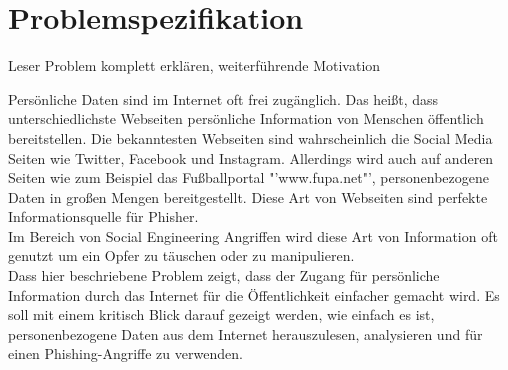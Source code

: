 

\chapter{Problemspezifikation}  %
\label{cha:Problemspezifikation} %
Leser Problem komplett erklären, weiterführende Motivation


Persönliche Daten sind im Internet oft frei zugänglich. Das heißt, dass unterschiedlichste Webseiten persönliche Information von Menschen öffentlich bereitstellen. Die bekanntesten Webseiten sind wahrscheinlich die Social Media Seiten wie Twitter, Facebook und Instagram. Allerdings wird auch auf anderen Seiten wie zum Beispiel das Fußballportal "'www.fupa.net"', personenbezogene Daten in großen Mengen bereitgestellt. Diese Art von Webseiten sind perfekte Informationsquelle für Phisher.\\
Im Bereich von Social Engineering Angriffen wird diese Art von Information oft genutzt um ein Opfer zu täuschen oder zu manipulieren.\\
Dass hier beschriebene Problem zeigt, dass der Zugang für persönliche Information durch das Internet für die Öffentlichkeit einfacher gemacht wird. Es soll mit einem kritisch Blick darauf gezeigt werden, wie einfach es ist, personenbezogene Daten aus dem Internet herauszulesen, analysieren und für einen Phishing-Angriffe zu verwenden.
